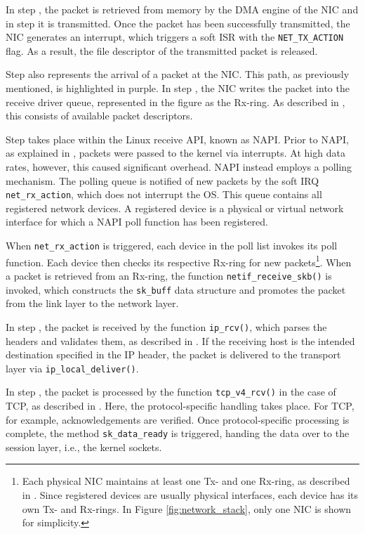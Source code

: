 In step , the packet is retrieved from memory by the \ac{DMA} engine of the \ac{NIC} and in step  it is transmitted.
Once the packet has been successfully transmitted, the \ac{NIC} generates an interrupt, which triggers a soft \ac{ISR} with the \texttt{NET\_TX\_ACTION} flag.
As a result, the file descriptor of the transmitted packet is released.

Step  also represents the arrival of a packet at the \ac{NIC}.
This path, as previously mentioned, is highlighted in purple.
In step , the \ac{NIC} writes the packet into the receive driver queue, represented in the figure as the Rx-ring.
As described in \cite[p. 4]{tx_napi}, this consists of available packet descriptors.

Step  takes place within the Linux receive API, known as NAPI.
Prior to NAPI, as explained in \cite[p. 4]{tx_napi}, packets were passed to the kernel via interrupts.
At high data rates, however, this caused significant overhead.
NAPI instead employs a polling mechanism.
The polling queue is notified of new packets by the soft \ac{IRQ} \texttt{net\_rx\_action}, which does not interrupt the \ac{OS}.
This queue contains all registered network devices.
A registered device is a physical or virtual network interface for which a NAPI poll function has been registered.

When \texttt{net\_rx\_action} is triggered, each device in the poll list invokes its poll function.
Each device then checks its respective Rx-ring for new packets\footnote{Each physical \ac{NIC} maintains at least one Tx- and one Rx-ring, as described in \cite[p. 4-6]{tx_napi}.
Since registered devices are usually physical interfaces, each device has its own Tx- and Rx-rings.
In Figure \ref{fig:network_stack}, only one \ac{NIC} is shown for simplicity.}.
When a packet is retrieved from an Rx-ring, the function \texttt{netif\_receive\_skb()} is invoked, which constructs the \texttt{sk\_buff} data structure and promotes the packet from the link layer to the network layer.

In step , the packet is received by the function \texttt{ip\_rcv()}, which parses the headers and validates them, as described in \cite{arnout}.
If the receiving host is the intended destination specified in the IP header, the packet is delivered to the transport layer via \texttt{ip\_local\_deliver()}.

In step , the packet is processed by the function \texttt{tcp\_v4\_rcv()} in the case of \ac{TCP}, as described in \cite{arnout}.
Here, the protocol-specific handling takes place.
For \ac{TCP}, for example, acknowledgements are verified.
Once protocol-specific processing is complete, the method \texttt{sk\_data\_ready} is triggered, handing the data over to the session layer, i.e., the kernel sockets.

